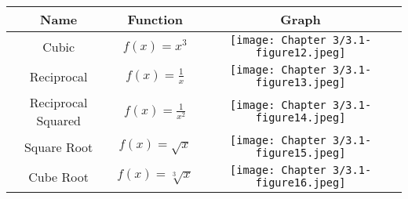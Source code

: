\documentclass[12pt]{book}
\begin{document}
\newpage

 \begin{tabular}{ |c|c|c|} 
         \hline
              \textbf{Name} & \textbf{Function} & \textbf{Graph} \\
            \hline
            Cubic & $f(x)=x^3$  &  \texttt{[image: Chapter 3/3.1-figure12.jpeg]}\\
            \hline
            Reciprocal & $f(x) = \frac{1}{x}$ &  \texttt{[image: Chapter 3/3.1-figure13.jpeg]} \\
            \hline
            Reciprocal Squared & $f(x)=\frac{1}{x^2}$ & \texttt{[image: Chapter 3/3.1-figure14.jpeg]}\\
            \hline
            Square Root & $f(x)=\sqrt{x}$ & \texttt{[image: Chapter 3/3.1-figure15.jpeg]}\\
            \hline
            Cube Root & $f(x)=\sqrt[3]{x}$ & \texttt{[image: Chapter 3/3.1-figure16.jpeg]}\\
            \hline
             \end{tabular}
\end{document}
